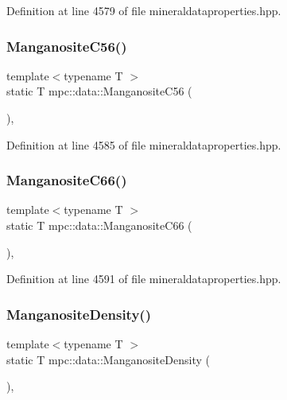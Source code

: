 Definition at line 4579 of file mineraldataproperties.\+hpp.

\mbox{\label{namespacempc_1_1data_ab572b62f814367506fe73eb0c3f56355}} 
\subsubsection{\texorpdfstring{Manganosite\+C56()}{ManganositeC56()}}
{\footnotesize\ttfamily template$<$typename T $>$ \\
static T mpc\+::data\+::\+Manganosite\+C56 (\begin{DoxyParamCaption}{ }\end{DoxyParamCaption})\hspace{0.3cm}{\ttfamily [inline]}, {\ttfamily [static]}}



Definition at line 4585 of file mineraldataproperties.\+hpp.

\mbox{\label{namespacempc_1_1data_aeaba2f4484fa8b5a49ea94eb594d570b}} 
\subsubsection{\texorpdfstring{Manganosite\+C66()}{ManganositeC66()}}
{\footnotesize\ttfamily template$<$typename T $>$ \\
static T mpc\+::data\+::\+Manganosite\+C66 (\begin{DoxyParamCaption}{ }\end{DoxyParamCaption})\hspace{0.3cm}{\ttfamily [inline]}, {\ttfamily [static]}}



Definition at line 4591 of file mineraldataproperties.\+hpp.

\mbox{\label{namespacempc_1_1data_a5092fbe2c43c4c823996a230fc048bdd}} 
\subsubsection{\texorpdfstring{Manganosite\+Density()}{ManganositeDensity()}}
{\footnotesize\ttfamily template$<$typename T $>$ \\
static T mpc\+::data\+::\+Manganosite\+Density (\begin{DoxyParamCaption}{ }\end{DoxyParamCaption})\hspace{0.3cm}{\ttfamily [inline]}, {\ttfamily [static]}}



